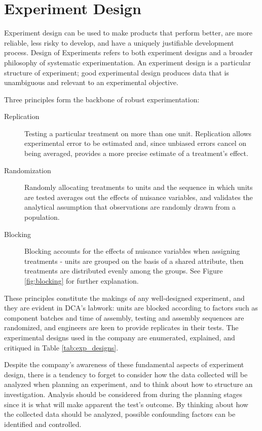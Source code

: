 \documentclass[11pt,a4paper,article]{memoir} %
\begin{document}
\section{Experiment Design}
Experiment design can be used to make products that perform better, are more reliable, less risky to develop, and have a uniquely justifiable development process. Design of Experiments refers to both experiment designs and a broader philosophy of systematic experimentation. An experiment design is a particular structure of experiment; good experimental design produces data that is unambiguous and relevant to an experimental objective.
\par
Three principles form the backbone of robust experimentation:
\begin{description}
\item[Replication]{Testing a particular treatment on more than one unit. Replication allows experimental error to be estimated and, since unbiased errors cancel on being averaged, provides a more precise estimate of a treatment's effect.}
\item[Randomization]{Randomly allocating treatments to units and the sequence in which units are tested averages out the effects of nuisance variables, and validates the analytical assumption that observations are randomly drawn from a population.}
\item[Blocking]{Blocking accounts for the effects of nuisance variables when assigning treatments - units are grouped on the basis of a shared attribute, then treatments are distributed evenly among the groups. See Figure \ref{fig:blocking} for further explanation.}
\end{description}
These principles constitute the makings of any well-designed experiment, and they are evident in DCA's labwork: units are blocked according to factors such as component batches and time of assembly, testing and assembly sequences are randomized, and engineers are keen to provide replicates in their tests. The experimental designs used in the company are enumerated, explained, and critiqued in Table \ref{tab:exp_designs}.
\par
Despite the company's awareness of these fundamental aspects of experiment design, there is a tendency to forget to consider how the data collected will be analyzed when planning an experiment, and to think about how to structure an investigation. Analysis should be considered from during the planning stages since it is what will make apparent the test's outcome. By thinking about how the collected data should be analyzed, possible confounding factors can be identified and controlled.
\end{document}
